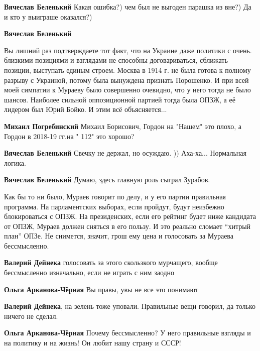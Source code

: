 \begin{itemize}
\begin{itemize}
\textbf{Вячеслав Беленький} Какая ошибка?) чем был не выгоден парашка из вне?)
Да и кто у выиграше оказался?)

\textbf{Вячеслав Беленький} 

Вы лишний раз подтверждаете тот факт, что на Украине даже политики с очень.
близкими позициями и взглядами не способны договариваться, сближать позиции,
выступать единым строем. Москва в 1914 г. не была готова к полному разрыву с
Украиной, потому была вынуждена признать Порошенко. И при всей моей симпатии к
Мураеву было совершенно очевидно, что у него тогда не было шансов. Наиболее
сильной оппозиционной партией тогда была ОПЗЖ, а её лидером был Юрий Бойко. И
этим всё объясняется...

\textbf{Михаил Погребинский} Михаил Борисович, Гордон на "Нашем" это плохо, а Гордон в 2018-19 гг.на " 112" это хорошо?

\textbf{Вячеслав Беленький} Свечку не держал, но осуждаю. )) Аха-ха... Нормальная логика.

\textbf{Вячеслав Беленький} Думаю, здесь главную роль сыграл Зурабов.

\end{itemize} %


Как бы то ни было, Мураев говорит по делу, и у его партии правильная программа.
На парламентских выборах, если пройдут, будут неизбежно блокироваться с ОПЗЖ.
На президенских, если его рейтинг будет ниже кандидата от ОПЗЖ, Мураев должен
сняться в его пользу. И это реально сломает \enquote{хитрый план} ОПЗе. Не снимется,
значит, грош ему цена и голосовать за Мураева бессмысленно.

\begin{itemize} %
\textbf{Валерий Дейнека} голосовать за этого скользкого мурчащего, вообще бессмысленно изначально, если не играть с ним заодно

\textbf{Ольга Арканова-Чёрная} Вы правы, увы не все это понимают

\textbf{Валерий Дейнека}, на зелень тоже уповали. Правильные вещи говорил, да только ничего не сделал.

\textbf{Ольга Арканова-Чёрная} Почему бессмысленно? У него правильные взгляды и на политику и на жизнь! Он любит нашу страну и СССР!


\end{itemize}
\end{itemize}
